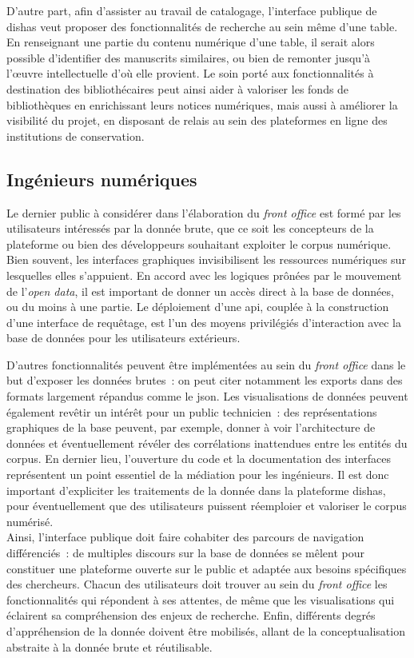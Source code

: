\documentclass[a4paper,12pt,twoside]{book}
\newcommand{\eng}{\emph}
\newcommand{\bdd}{base de données\xspace}
\newcommand{\dishas}{\gls{dishas}\xspace}
\newcommand{\api}{\gls{api}\xspace}
\newcommand{\json}{\gls{json}\xspace}
\begin{document}
D'autre part, afin d'assister au travail de catalogage, l'interface publique de \dishas veut proposer des fonctionnalités de recherche au sein même d'une table. En renseignant une partie du contenu numérique d'une table, il serait alors possible d'identifier des manuscrits similaires, ou bien de remonter jusqu'à l'œuvre intellectuelle d'où elle provient. Le soin porté aux fonctionnalités à destination des bibliothécaires peut ainsi aider à valoriser les fonds de bibliothèques en enrichissant leurs notices numériques, mais aussi à améliorer la visibilité du projet, en disposant de relais au sein des plateformes en ligne des institutions de conservation.

		\subsection{Ingénieurs numériques}
Le dernier public à considérer dans l'élaboration du \eng{front office} est formé par les utilisateurs intéressés par la donnée brute, que ce soit les concepteurs de la plateforme ou bien des développeurs souhaitant exploiter le corpus numérique. Bien souvent, les interfaces graphiques invisibilisent les ressources numériques sur lesquelles elles s'appuient. En accord avec les logiques prônées par le mouvement de l'\eng{open data}, il est important de donner un accès direct à la base de données, ou du moins à une partie. Le déploiement d'une \api, couplée à la construction d'une interface de requêtage, est l'un des moyens privilégiés d'interaction avec la \bdd pour les utilisateurs extérieurs.

D'autres fonctionnalités peuvent être implémentées au sein du \eng{front office} dans le but d'exposer les données brutes~: on peut citer notamment les exports dans des formats largement répandus comme le \json. Les visualisations de données peuvent également revêtir un intérêt pour un public technicien~: des représentations graphiques de la base peuvent, par exemple, donner à voir l'architecture de données et éventuellement révéler des corrélations inattendues entre les entités du corpus. En dernier lieu, l'ouverture du code et la documentation des interfaces représentent un point essentiel de la médiation pour les ingénieurs. Il est donc important d'expliciter les traitements de la donnée dans la plateforme \dishas, pour éventuellement que des utilisateurs puissent réemploier et valoriser le corpus numérisé.\\

Ainsi, l'interface publique doit faire cohabiter des parcours de navigation différenciés~: de multiples discours sur la \bdd se mêlent pour constituer une plateforme ouverte sur le public et adaptée aux besoins spécifiques des chercheurs. Chacun des utilisateurs doit trouver au sein du \eng{front office} les fonctionnalités qui répondent à ses attentes, de même que les visualisations qui éclairent sa compréhension des enjeux de recherche. Enfin, différents degrés d'appréhension de la donnée doivent être mobilisés, allant de la conceptualisation abstraite à la donnée brute et réutilisable.
\end{document}
